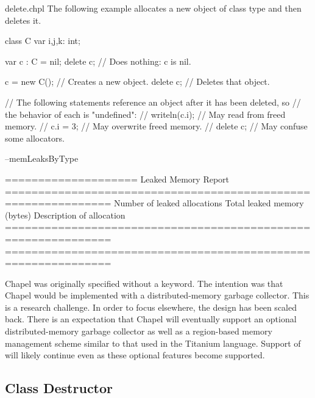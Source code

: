 \begin{chapelexample}{delete.chpl}
The following example allocates a new object  of class type 
and then deletes it.
\begin{chapelpre}
class C {
  var i,j,k: int;
}
\end{chapelpre}
\begin{chapel}
var c : C = nil;
delete c;        // Does nothing: c is nil.

c = new C();     // Creates a new object.
delete c;        // Deletes that object.

// The following statements reference an object after it has been deleted, so
// the behavior of each is "undefined":
// writeln(c.i); // May read from freed memory.
// c.i = 3;      // May overwrite freed memory.
// delete c;     // May confuse some allocators.
\end{chapel}
\begin{chapelpost}
\end{chapelpost}
\begin{chapelexecopts}
--memLeaksByType
\end{chapelexecopts}
\begin{chapeloutput}

====================
Leaked Memory Report
==============================================================
Number of leaked allocations
           Total leaked memory (bytes)
                      Description of allocation
==============================================================
==============================================================
\end{chapeloutput}
\end{chapelexample}

\begin{openissue}
Chapel was originally specified without a  keyword.  The intention
was that Chapel would be implemented with a distributed-memory garbage
collector.  This is a research challenge.  In order to focus elsewhere, the
design has been scaled back.  There is an expectation that Chapel will
eventually support an optional distributed-memory garbage collector as well as
a region-based memory management scheme similar to that used in the Titanium
language.  Support of  will likely continue even as these optional
features become supported.
\end{openissue}


\subsection{Class Destructor}
\label{Class_Destructor}

